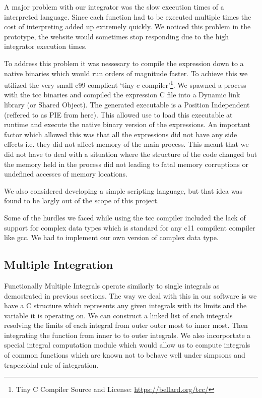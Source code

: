 \documentclass[12pt]{article}
\begin{document}
A major problem with our integrator was the slow execution times of a interpreted language. Since each function
had to be executed multiple times the cost of interpreting added up extremely quickly. We noticed this problem in
the prototype, the website would sometimes stop responding due to the high integrator execution times.

To address this problem it was nessesary to compile the expression down to a native binaries which would run orders
of magnitude faster. To achieve this we utilized the very small c99 complient `tiny c compiler'\footnote{Tiny C Compiler Source and License: \url{https://bellard.org/tcc/}}.
We spawned a process with the tcc binaries and compiled the expression C file into a Dynamic link library (or Shared Object).
The generated executable is a Position Independent (reffered to as PIE from here). This allowed use to load this executable at runtime
and execute the native binary version of the expressions. An important factor which allowed this was that all the expressions did not have
any side effects i.e. they did not affect memory of the main process. This meant that we did not have to deal with a situation where the
structure of the code changed but the memory held in the process did not leading to fatal memory corruptions or undefined accesses of memory
locations.

We also considered developing a simple scripting language, but that idea was found to be largly out of the scope of this project.

Some of the hurdles we faced while using the tcc compiler included the lack of support for complex data types which is standard for any c11 compilent
compiler like gcc. We had to implement our own version of complex data type.

\subsection{Multiple Integration}

Functionally Multiple Integrals operate similarly to single integrals as demostrated in previous sections. The way we deal with this in our software is
we have a C structure which represents any given integrals with its limits and the variable it is operating on. We can construct a linked list of such integrals
resolving the limits of each integral from outer outer most to inner most. Then integrating the function from inner to to outer integrals. We also incorportate
a special integral computation module which would allow us to compute integrals of common functions which are known not to behave well under simpsons and 
trapezoidal rule of integration.
\end{document}
